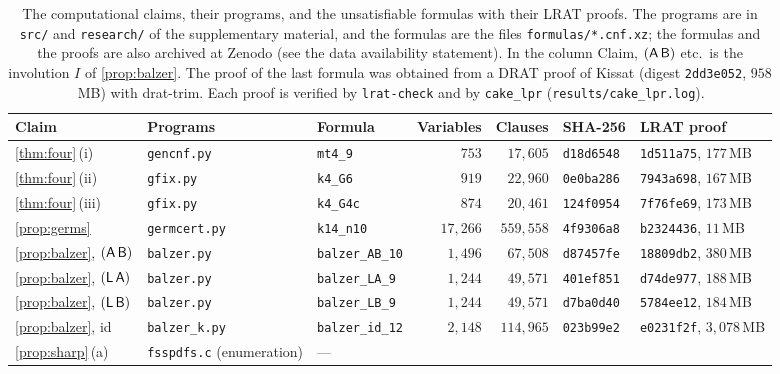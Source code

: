 \begin{table}[ht]
\centering\footnotesize
\caption{The computational claims, their programs, and the unsatisfiable
formulas with their LRAT proofs. The programs are in \texttt{src/} and
\texttt{research/} of the supplementary material, and the formulas are the files
\texttt{formulas/*.cnf.xz}; the formulas and the proofs are also archived at
Zenodo (see the data availability statement). In the column Claim, $(\mathsf A\,\mathsf B)$ etc.\ is the
involution $I$ of \cref{prop:balzer}. The proof of the last formula was obtained
from a DRAT proof of Kissat (digest \texttt{2dd3e052}, $958$\,MB) with
\textsf{drat-trim}. Each proof is verified by \texttt{lrat-check} and by
\texttt{cake\_lpr} (\texttt{results/cake\_lpr.log}).}
\label{tab:artefacts}
\setlength{\tabcolsep}{3pt}
\begin{tabular}{@{}l>{\raggedright\arraybackslash}p{}lrrll@{}}
\toprule
Claim & Programs & Formula & Variables & Clauses & SHA-256 & LRAT proof\\
\midrule
\ref{thm:four}\,(i) & \texttt{gencnf.py} & \texttt{mt4\_9} & $753$ & $17{,}605$ & \texttt{d18d6548} & \texttt{1d511a75}, $177$\,MB\\
\ref{thm:four}\,(ii) & \texttt{gfix.py} & \texttt{k4\_G6} & $919$ & $22{,}960$ & \texttt{0e0ba286} & \texttt{7943a698}, $167$\,MB\\
\ref{thm:four}\,(iii) & \texttt{gfix.py} & \texttt{k4\_G4c} & $874$ & $20{,}461$ & \texttt{124f0954} & \texttt{7f76fe69}, $173$\,MB\\
\ref{prop:germs} & \texttt{germcert.py} & \texttt{k14\_n10} & $17{,}266$ & $559{,}558$ & \texttt{4f9306a8} & \texttt{b2324436}, $11$\,MB\\
\ref{prop:balzer}, $(\mathsf A\,\mathsf B)$ & \texttt{balzer.py} & \texttt{balzer\_AB\_10} & $1{,}496$ & $67{,}508$ & \texttt{d87457fe} & \texttt{18809db2}, $380$\,MB\\
\ref{prop:balzer}, $(\mathsf L\,\mathsf A)$ & \texttt{balzer.py} & \texttt{balzer\_LA\_9} & $1{,}244$ & $49{,}571$ & \texttt{401ef851} & \texttt{d74de977}, $188$\,MB\\
\ref{prop:balzer}, $(\mathsf L\,\mathsf B)$ & \texttt{balzer.py} & \texttt{balzer\_LB\_9} & $1{,}244$ & $49{,}571$ & \texttt{d7ba0d40} & \texttt{5784ee12}, $184$\,MB\\
\ref{prop:balzer}, id & \texttt{balzer\_k.py} & \texttt{balzer\_id\_12} & $2{,}148$ & $114{,}965$ & \texttt{023b99e2} & \texttt{e0231f2f}, $3{,}078$\,MB\\
\midrule
\ref{prop:sharp}\,(a) & \texttt{fsspdfs.c} (enumeration) & \multicolumn{5}{l}{---}\\

\end{tabular}
\end{table}
